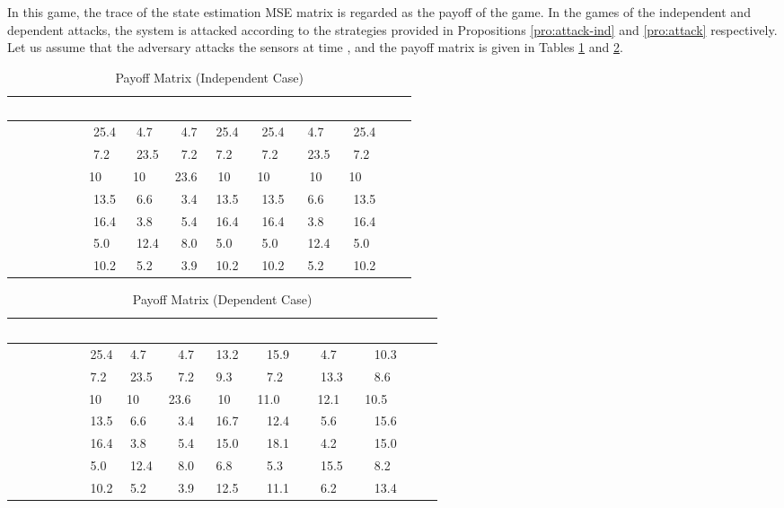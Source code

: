 \documentclass{article}
\begin{document}
 In this game, the trace of the  state estimation MSE matrix is regarded as the payoff of the game. In the games of the independent  and dependent attacks, the system is attacked according to the strategies provided  in Propositions \ref{pro:attack-ind} and \ref{pro:attack} respectively. Let us assume that the  adversary attacks the sensors at time , and  the payoff matrix is given in Tables \ref{table:independent} and \ref{table:dependent}. 
\begin{table}
\caption{Payoff  Matrix (Independent Case)}
\vspace{0.1in}
{\footnotesize
	\begin{tabular}{|c|c|c|c|c|c|c|c|}
	\hline
	          &    &   &   &  &  &  &  \\ \hline
	           & 25.4 & 4.7  & 4.7 & 25.4  & 25.4  & 4.7   & 25.4     \\ 
	           & 7.2  & 23.5 & 7.2 & 7.2   & 7.2   & 23.5  & 7.2      \\ 
	         & 10    & 10    & 23.6  & 10   & 10     & 10   & 10        \\ 
	        & 13.5 & 6.6  & 3.4 & 13.5  & 13.5  & 6.6   & 13.5     \\ 
	        & 16.4 & 3.8  & 5.4 & 16.4  & 16.4  & 3.8   & 16.4     \\ 
	        & 5.0  & 12.4 & 8.0 & 5.0   & 5.0   & 12.4  & 5.0      \\ 
	     & 10.2 & 5.2  & 3.9 & 10.2  & 10.2  & 5.2   & 10.2     \\ \hline
	\end{tabular}
	}

\label{table:independent}
\end{table}
 \begin{table}
\caption{Payoff Matrix (Dependent Case)}
\vspace{0.1in}
{\footnotesize
 	\begin{tabular}{|c|c|c|c|c|c|c|c|}
 	\hline
 	          &    &   &   &  &  &  &  \\ \hline
 	           & 25.4 & 4.7  & 4.7 & 13.2  & 15.9  & 4.7   & 10.3     \\ 
 	           & 7.2  & 23.5 & 7.2 & 9.3   & 7.2   & 13.3  & 8.6      \\ 
 	         & 10   & 10   & 23.6   & 10   & 11.0     & 12.1  & 10.5        \\ 
 	        & 13.5 & 6.6  & 3.4 & 16.7  & 12.4  & 5.6   & 15.6     \\ 
 	        & 16.4 & 3.8  & 5.4 & 15.0  & 18.1  & 4.2   & 15.0     \\ 
 	        & 5.0  & 12.4 & 8.0 & 6.8   & 5.3   & 15.5  & 8.2      \\ 
 	     & 10.2 & 5.2  & 3.9 & 12.5  & 11.1  & 6.2   & 13.4     \\ \hline
 	\end{tabular}
 	}
 
 \label{table:dependent}
 \end{table}
\end{document}
